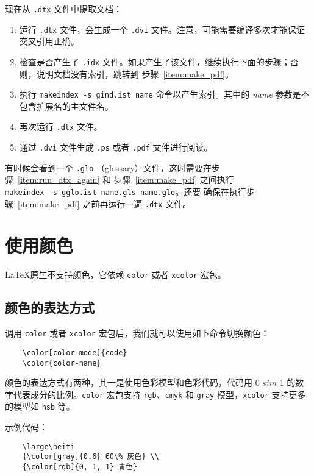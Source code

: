 \documentclass[UTF8]{ctexart}
\begin{document}
现在从 \texttt{.dtx} 文件中提取文档：
\begin{enumerate}
    \item 运行 \texttt{.dtx} 文件，会生成一个 \texttt{.dvi} 文件。注意，可能需要编译多次才能保证交叉引用正确。
    \item 检查是否产生了 \texttt{.idx} 文件。如果产生了该文件，继续执行下面的步骤；否则，说明文档没有索引，跳转到
    步骤~\ref{item:make_pdf}。
    \item 执行 \texttt{makeindex -s gind.ist name} 命令以产生索引。其中的 \emph{name} 参数是不
    包含扩展名的主文件名。
    \item \label{item:run_dtx_again} 再次运行 \texttt{.dtx} 文件。
    \item \label{item:make_pdf} 通过 \texttt{.dvi} 文件生成 \texttt{.ps} 或者 \texttt{.pdf} 文件进行阅读。
\end{enumerate}

有时候会看到一个 \texttt{.glo} （glossary）文件，这时需要在步骤~\ref{item:run_dtx_again} 和
步骤~\ref{item:make_pdf} 之间执行 \\ \texttt{makeindex -s gglo.ist name.gls name.glo}。还要
确保在执行步骤~\ref{item:make_pdf} 之前再运行一遍 \texttt{.dtx} 文件。

\section{使用颜色}
\LaTeX 原生不支持颜色，它依赖 \texttt{color} 或者 \texttt{xcolor} 宏包。

\subsection{颜色的表达方式}
调用 \texttt{color} 或者 \texttt{xcolor} 宏包后，我们就可以使用如下命令切换颜色：
\begin{verbatim}
    \color[color-mode]{code}
    \color{color-name}
\end{verbatim}

颜色的表达方式有两种，其一是使用色彩模型和色彩代码，代码用 0 $sim$ 1 的数字代表成分的比例。\texttt{color} 宏包支持
\texttt{rgb}、\texttt{cmyk} 和 \texttt{gray} 模型，\texttt{xcolor} 支持更多的模型如 \texttt{hsb} 等。

示例代码：
\begin{verbatim}
    \large\heiti
    {\color[gray]{0.6} 60\% 灰色} \\
    {\color[rgb]{0, 1, 1} 青色}
\end{verbatim}
\end{document}
